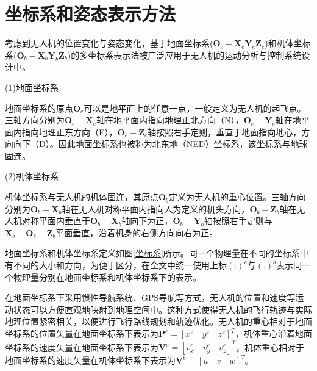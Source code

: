 \section{坐标系和姿态表示方法}

考虑到无人机的位置变化与姿态变化，基于地面坐标系($\boldsymbol{O}_e-\boldsymbol{X}_e\boldsymbol{Y}_e\boldsymbol{Z}_e $)和机体坐标系(${\boldsymbol{O}_b}-{\boldsymbol{X}_b}{\boldsymbol{Y}_b}{\boldsymbol{Z}_b}$)的多坐标系表示法被广泛应用于无人机的运动分析与控制系统设计中。

(1)地面坐标系

地面坐标系的原点$\boldsymbol{O}_e$可以是地平面上的任意一点，一般定义为无人机的起飞点。三轴方向分别为$\boldsymbol{O}_e-\boldsymbol{X}_e$轴在地平面内指向地理正北方向（N），$\boldsymbol{O}_e-\boldsymbol{Y}_e$轴在地平面内指向地理正东方向（E），$\boldsymbol{O}_e-\boldsymbol{Z}_e$轴按照右手定则，垂直于地面指向地心，方向向下（D）。因此地面坐标系也被称为北东地（NED）坐标系，该坐标系与地球固连。

(2)机体坐标系

机体坐标系与无人机的机体固连，其原点$\boldsymbol{O}_b$定义为无人机的重心位置。三轴方向分别为$\boldsymbol{O}_b-\boldsymbol{X}_b$轴在无人机对称平面内指向人为定义的机头方向，$\boldsymbol{O}_b-\boldsymbol{Z}_b$轴在无人机对称平面内垂直于$\boldsymbol{O}_b-\boldsymbol{X}_b$轴向下为正，$\boldsymbol{O}_b-\boldsymbol{Y}_b$轴按照右手定则与$\boldsymbol{X}_b-\boldsymbol{O}_b-\boldsymbol{Z}_b$平面垂直，沿着机身的右侧方向向右为正。

地面坐标系和机体坐标系定义如图\ref{坐标系}所示。同一个物理量在不同的坐标系中有不同的大小和方向，为便于区分，在全文中统一使用上标$(.)^{e}$与$(.)^{b}$表示同一个物理量分别在地面坐标系和机体坐标系下的表示。

在地面坐标系下采用惯性导航系统、GPS导航等方式，无人机的位置和速度等运动状态可以方便直观地映射到地理空间中。这种方式使得无人机的飞行轨迹与实际地理位置紧密相关，以便进行飞行路线规划和轨迹优化。无人机的重心相对于地面坐标系的位置矢量在地面坐标系下表示为$\boldsymbol{P}^{e}=[{x}^{e} \quad {y}^{e} \quad {z}^{e}]^{T}$，机体重心沿着地面坐标系的速度矢量在地面坐标系下表示为$\boldsymbol{V}^{e}=[{v}^{e}_{x} \quad {v}^{e}_{y} \quad {v}^{e}_{z}]^{T}$，机体重心相对于地面坐标系的速度矢量在机体坐标系下表示为$\boldsymbol{V}^{b}=[{u} \quad {v} \quad {w}]^{T}$。

